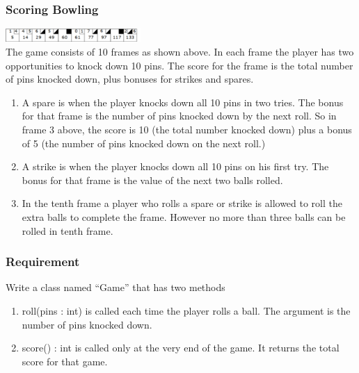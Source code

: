 \documentclass{beamer}
\begin{document}
\begin{frame}
 \frametitle{Scoring Bowling}
  \includegraphics[height=0.2in]{Bowling} \\
The game consists of 10 frames as shown above.  In each frame the player has
two opportunities to knock down 10 pins.  The score for the frame is the total
number of pins knocked down, plus bonuses for strikes and spares.\\
 \begin{enumerate}
 \item \alert{A spare} is when the player knocks down all 10 pins in two tries.  The bonus for
that frame is the number of pins knocked down by the next roll.  So in frame 3
above, the score is 10 (the total number knocked down) plus a bonus of 5 (the
number of pins knocked down on the next roll.)\\

 \item \alert{A strike} is when the player knocks down all 10 pins on his first try.  The bonus
for that frame is the value of the next two balls rolled.\\

 \item In the tenth frame a player who rolls a spare or strike is allowed to roll the extra
balls to complete the frame.  However no more than three balls can be rolled in
tenth frame.
 \end{enumerate}

\end{frame}

\begin{frame}
 \frametitle{Requirement}
Write a class named “Game” that has two methods
  \begin{enumerate}
  \item roll(pins : int) is called each time the player rolls a ball.  The argument is the number of pins knocked down.
  \item score() : int is called only at the very end of the game.  It returns the total score for that game.
  \end{enumerate}
\end{frame}
\end{document}
